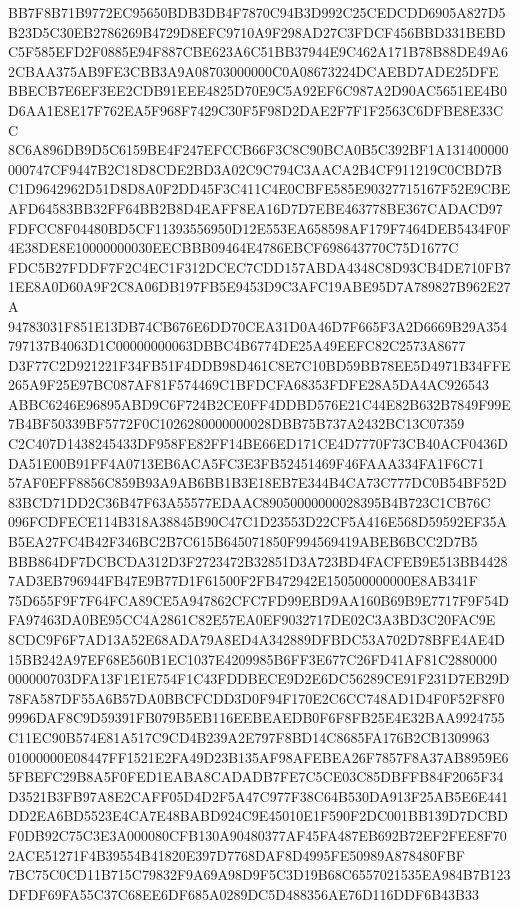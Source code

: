\documentclass[UTF8,fontset=fandol,zihao=-4,a4paper]{ctexart}
\begin{document}
{{BB7F8B71B9772EC95650BDB3DB4F7870C94B3D992C25CEDCDD6905A827D5B23D5C30EB2786269B4729D8EFC9710A9F298AD27C3FDCF456BBD331BEBD
C5F585EFD2F0885E94F887CBE623A6C51BB37944E9C462A171B78B88DE49A62CBAA375AB9FE3CBB3A9A08703000000C0A08673224DCAEBD7ADE25DFE
BBECB7E6EF3EE2CDB91EEE4825D70E9C5A92EF6C987A2D90AC5651EE4B0D6AA1E8E17F762EA5F968F7429C30F5F98D2DAE2F7F1F2563C6DFBE8E33CC
8C6A896DB9D5C6159BE4F247EFCCB66F3C8C90BCA0B5C392BF1A131400000000747CF9447B2C18D8CDE2BD3A02C9C794C3AACA2B4CF911219C0CBD7B
C1D9642962D51D8D8A0F2DD45F3C411C4E0CBFE585E90327715167F52E9CBEAFD64583BB32FF64BB2B8D4EAFF8EA16D7D7EBE463778BE367CADACD97
FDFCC8F04480BD5CF11393556950D12E553EA658598AF179F7464DEB5434F0F4E38DE8E10000000030EECBBB09464E4786EBCF698643770C75D1677C
FDC5B27FDDF7F2C4EC1F312DCEC7CDD157ABDA4348C8D93CB4DE710FB71EE8A0D60A9F2C8A06DB197FB5E9453D9C3AFC19ABE95D7A789827B962E27A
94783031F851E13DB74CB676E6DD70CEA31D0A46D7F665F3A2D6669B29A354797137B4063D1C00000000063DBBC4B6774DE25A49EEFC82C2573A8677
D3F77C2D921221F34FB51F4DDB98D461C8E7C10BD59BB78EE5D4971B34FFE265A9F25E97BC087AF81F574469C1BFDCFA68353FDFE28A5DA4AC926543
ABBC6246E96895ABD9C6F724B2CE0FF4DDBD576E21C44E82B632B7849F99E7B4BF50339BF5772F0C1026280000000028DBB75B737A2432BC13C07359
C2C407D1438245433DF958FE82FF14BE66ED171CE4D7770F73CB40ACF0436DDA51E00B91FF4A0713EB6ACA5FC3E3FB52451469F46FAAA334FA1F6C71
57AF0EFF8856C859B93A9AB6BB1B3E18EB7E344B4CA73C777DC0B54BF52D83BCD71DD2C36B47F63A55577EDAAC89050000000028395B4B723C1CB76C
096FCDFECE114B318A38845B90C47C1D23553D22CF5A416E568D59592EF35AB5EA27FC4B42F346BC2B7C615B645071850F994569419ABEB6BCC2D7B5
BBB864DF7DCBCDA312D3F2723472B32851D3A723BD4FACFEB9E513BB44287AD3EB796944FB47E9B77D1F61500F2FB472942E150500000000E8AB341F
75D655F9F7F64FCA89CE5A947862CFC7FD99EBD9AA160B69B9E7717F9F54DFA97463DA0BE95CC4A2861C82E57EA0EF9032717DE02C3A3BD3C20FAC9E
8CDC9F6F7AD13A52E68ADA79A8ED4A342889DFBDC53A702D78BFE4AE4D15BB242A97EF68E560B1EC1037E4209985B6FF3E677C26FD41AF81C2880000
000000703DFA13F1E1E754F1C43FDDBECE9D2E6DC56289CE91F231D7EB29D78FA587DF55A6B57DA0BBCFCDD3D0F94F170E2C6CC748AD1D4F0F52F8F0
9996DAF8C9D59391FB079B5EB116EEBEAEDB0F6F8FB25E4E32BAA9924755C11EC90B574E81A517C9CD4B239A2E797F8BD14C8685FA176B2CB1309963
01000000E08447FF1521E2FA49D23B135AF98AFEBEA26F7857F8A37AB8959E65FBEFC29B8A5F0FED1EABA8CADADB7FE7C5CE03C85DBFFB84F2065F34
D3521B3FB97A8E2CAFF05D4D2F5A47C977F38C64B530DA913F25AB5E6E441DD2EA6BD5523E4CA7E48BABD924C9E45010E1F590F2DC001BB139D7DCBD
F0DB92C75C3E3A000080CFB130A90480377AF45FA487EB692B72EF2FEE8F702ACE51271F4B39554B41820E397D7768DAF8D4995FE50989A878480FBF
7BC75C0CD11B715C79832F9A69A98D9F5C3D19B68C6557021535EA984B7B123DFDF69FA55C37C68EE6DF685A0289DC5D488356AE76D116DDF6B43B33
}}
\end{document}
